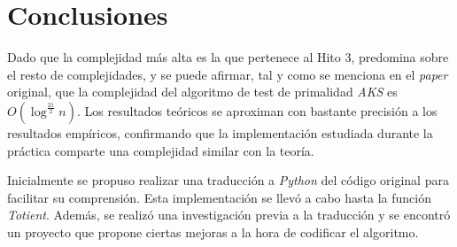 \documentclass{uc3mpracticas}
\begin{document}
  \newpage

  \section{Conclusiones}

  Dado que la complejidad más alta es la que pertenece al Hito 3, predomina sobre el resto de complejidades, y se puede afirmar, tal y como se menciona en el \textit{paper} original\cite{primesinp}, que la complejidad del algoritmo de test de primalidad \textit{AKS} es $ O(\log^\frac{21}{2}n) $. Los resultados teóricos se aproximan con bastante precisión a los resultados empíricos, confirmando que la implementación estudiada durante la práctica comparte una complejidad similar con la teoría.

  \vspace{3mm}

  Inicialmente se propuso realizar una traducción a \textit{Python} del código original para facilitar su comprensión. Esta implementación se llevó a cabo hasta la función \textit{Totient}. Además, se realizó una investigación previa a la traducción y se encontró un proyecto\cite{aks_git} que propone ciertas mejoras a la hora de codificar el algoritmo.

  \newpage

  
  
\end{document}
